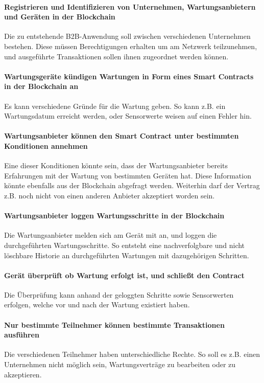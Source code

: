 \paragraph{Registrieren und Identifizieren von Unternehmen, Wartungsanbietern und Geräten in der Blockchain}
Die zu entstehende B2B-Anwendung soll zwischen verschiedenen Unternehmen bestehen. Diese müssen Berechtigungen erhalten um am Netzwerk teilzunehmen, und ausgeführte Transaktionen sollen ihnen zugeordnet werden können.

\paragraph{Wartungsgeräte kündigen Wartungen in Form eines Smart Contracts in der Blockchain an}
Es kann verschiedene Gründe für die Wartung geben. So kann z.B. ein Wartungsdatum erreicht werden, oder Sensorwerte weisen auf einen Fehler hin.

\paragraph{Wartungsanbieter können den Smart Contract unter bestimmten Konditionen annehmen}
Eine dieser Konditionen könnte sein, dass der Wartungsanbieter bereits Erfahrungen mit der Wartung von bestimmten Geräten hat. Diese Information könnte ebenfalls aus der Blockchain abgefragt werden. Weiterhin darf der Vertrag z.B. noch nicht von einen anderen Anbieter akzeptiert worden sein. 

\paragraph{Wartungsanbieter loggen Wartungsschritte in der Blockchain}
Die Wartungsanbieter melden sich am Gerät mit an, und loggen die durchgeführten Wartungsschritte. So entsteht eine nachverfolgbare und nicht löschbare Historie an durchgeführten Wartungen mit dazugehörigen Schritten.

\paragraph{Gerät überprüft ob Wartung erfolgt ist, und schließt den Contract}
Die Überprüfung kann anhand der geloggten Schritte sowie Sensorwerten erfolgen, welche vor und nach der Wartung existiert haben.

\paragraph{Nur bestimmte Teilnehmer können bestimmte Transaktionen ausführen}
Die verschiedenen Teilnehmer haben unterschiedliche Rechte. So soll es z.B. einen Unternehmen nicht möglich sein, Wartungsverträge zu bearbeiten oder zu akzeptieren.

